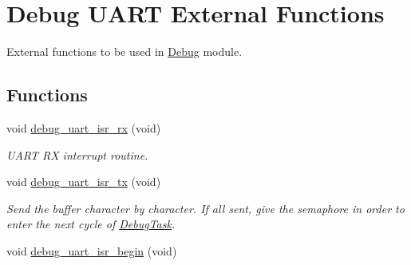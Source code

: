 \hypertarget{group___debug___u_a_r_t___external___functions}{}\section{Debug U\+A\+RT External Functions}
\label{group___debug___u_a_r_t___external___functions}


External functions to be used in \hyperlink{group___debug}{Debug} module.  


\subsection*{Functions}
\begin{DoxyCompactItemize}
\item 
void \hyperlink{group___debug___u_a_r_t___external___functions_ga2e1878be0250daf30f0a286af6e683e9}{debug\+\_\+uart\+\_\+isr\+\_\+rx} (void)\hypertarget{group___debug___u_a_r_t___external___functions_ga2e1878be0250daf30f0a286af6e683e9}{}\label{group___debug___u_a_r_t___external___functions_ga2e1878be0250daf30f0a286af6e683e9}

\begin{DoxyCompactList}\small\item\em U\+A\+RT RX interrupt routine. \end{DoxyCompactList}\item 
void \hyperlink{group___debug___u_a_r_t___external___functions_gaee765dd75f3414ade869071798ff33f4}{debug\+\_\+uart\+\_\+isr\+\_\+tx} (void)\hypertarget{group___debug___u_a_r_t___external___functions_gaee765dd75f3414ade869071798ff33f4}{}\label{group___debug___u_a_r_t___external___functions_gaee765dd75f3414ade869071798ff33f4}

\begin{DoxyCompactList}\small\item\em Send the buffer character by character. If all sent, give the semaphore in order to enter the next cycle of \hyperlink{group___debug___exported___functions___group3_ga0e7fca846e34e06a1f62249fe8a30a44}{Debug\+Task}. \end{DoxyCompactList}\item 
void \hyperlink{group___debug___u_a_r_t___external___functions_ga9d19c0e57b2d37c01bd781338322f682}{debug\+\_\+uart\+\_\+isr\+\_\+begin} (void)\hypertarget{group___debug___u_a_r_t___external___functions_ga9d19c0e57b2d37c01bd781338322f682}{}\label{group___debug___u_a_r_t___external___functions_ga9d19c0e57b2d37c01bd781338322f682}


\end{DoxyCompactItemize}
